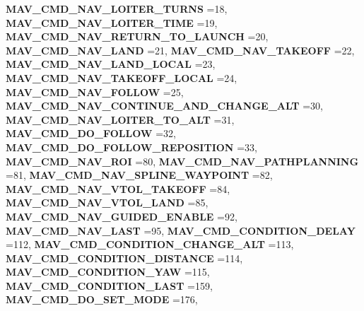 \begin{DoxyCompactItemize}
\textbf{ M\+A\+V\+\_\+\+C\+M\+D\+\_\+\+N\+A\+V\+\_\+\+L\+O\+I\+T\+E\+R\+\_\+\+T\+U\+R\+NS} =18, 
\textbf{ M\+A\+V\+\_\+\+C\+M\+D\+\_\+\+N\+A\+V\+\_\+\+L\+O\+I\+T\+E\+R\+\_\+\+T\+I\+ME} =19, 
\textbf{ M\+A\+V\+\_\+\+C\+M\+D\+\_\+\+N\+A\+V\+\_\+\+R\+E\+T\+U\+R\+N\+\_\+\+T\+O\+\_\+\+L\+A\+U\+N\+CH} =20, 
\newline
\textbf{ M\+A\+V\+\_\+\+C\+M\+D\+\_\+\+N\+A\+V\+\_\+\+L\+A\+ND} =21, 
\textbf{ M\+A\+V\+\_\+\+C\+M\+D\+\_\+\+N\+A\+V\+\_\+\+T\+A\+K\+E\+O\+FF} =22, 
\textbf{ M\+A\+V\+\_\+\+C\+M\+D\+\_\+\+N\+A\+V\+\_\+\+L\+A\+N\+D\+\_\+\+L\+O\+C\+AL} =23, 
\textbf{ M\+A\+V\+\_\+\+C\+M\+D\+\_\+\+N\+A\+V\+\_\+\+T\+A\+K\+E\+O\+F\+F\+\_\+\+L\+O\+C\+AL} =24, 
\newline
\textbf{ M\+A\+V\+\_\+\+C\+M\+D\+\_\+\+N\+A\+V\+\_\+\+F\+O\+L\+L\+OW} =25, 
\textbf{ M\+A\+V\+\_\+\+C\+M\+D\+\_\+\+N\+A\+V\+\_\+\+C\+O\+N\+T\+I\+N\+U\+E\+\_\+\+A\+N\+D\+\_\+\+C\+H\+A\+N\+G\+E\+\_\+\+A\+LT} =30, 
\textbf{ M\+A\+V\+\_\+\+C\+M\+D\+\_\+\+N\+A\+V\+\_\+\+L\+O\+I\+T\+E\+R\+\_\+\+T\+O\+\_\+\+A\+LT} =31, 
\textbf{ M\+A\+V\+\_\+\+C\+M\+D\+\_\+\+D\+O\+\_\+\+F\+O\+L\+L\+OW} =32, 
\newline
\textbf{ M\+A\+V\+\_\+\+C\+M\+D\+\_\+\+D\+O\+\_\+\+F\+O\+L\+L\+O\+W\+\_\+\+R\+E\+P\+O\+S\+I\+T\+I\+ON} =33, 
\textbf{ M\+A\+V\+\_\+\+C\+M\+D\+\_\+\+N\+A\+V\+\_\+\+R\+OI} =80, 
\textbf{ M\+A\+V\+\_\+\+C\+M\+D\+\_\+\+N\+A\+V\+\_\+\+P\+A\+T\+H\+P\+L\+A\+N\+N\+I\+NG} =81, 
\textbf{ M\+A\+V\+\_\+\+C\+M\+D\+\_\+\+N\+A\+V\+\_\+\+S\+P\+L\+I\+N\+E\+\_\+\+W\+A\+Y\+P\+O\+I\+NT} =82, 
\newline
\textbf{ M\+A\+V\+\_\+\+C\+M\+D\+\_\+\+N\+A\+V\+\_\+\+V\+T\+O\+L\+\_\+\+T\+A\+K\+E\+O\+FF} =84, 
\textbf{ M\+A\+V\+\_\+\+C\+M\+D\+\_\+\+N\+A\+V\+\_\+\+V\+T\+O\+L\+\_\+\+L\+A\+ND} =85, 
\textbf{ M\+A\+V\+\_\+\+C\+M\+D\+\_\+\+N\+A\+V\+\_\+\+G\+U\+I\+D\+E\+D\+\_\+\+E\+N\+A\+B\+LE} =92, 
\textbf{ M\+A\+V\+\_\+\+C\+M\+D\+\_\+\+N\+A\+V\+\_\+\+L\+A\+ST} =95, 
\newline
\textbf{ M\+A\+V\+\_\+\+C\+M\+D\+\_\+\+C\+O\+N\+D\+I\+T\+I\+O\+N\+\_\+\+D\+E\+L\+AY} =112, 
\textbf{ M\+A\+V\+\_\+\+C\+M\+D\+\_\+\+C\+O\+N\+D\+I\+T\+I\+O\+N\+\_\+\+C\+H\+A\+N\+G\+E\+\_\+\+A\+LT} =113, 
\textbf{ M\+A\+V\+\_\+\+C\+M\+D\+\_\+\+C\+O\+N\+D\+I\+T\+I\+O\+N\+\_\+\+D\+I\+S\+T\+A\+N\+CE} =114, 
\textbf{ M\+A\+V\+\_\+\+C\+M\+D\+\_\+\+C\+O\+N\+D\+I\+T\+I\+O\+N\+\_\+\+Y\+AW} =115, 
\newline
\textbf{ M\+A\+V\+\_\+\+C\+M\+D\+\_\+\+C\+O\+N\+D\+I\+T\+I\+O\+N\+\_\+\+L\+A\+ST} =159, 
\textbf{ M\+A\+V\+\_\+\+C\+M\+D\+\_\+\+D\+O\+\_\+\+S\+E\+T\+\_\+\+M\+O\+DE} =176, 

\end{DoxyCompactItemize}
